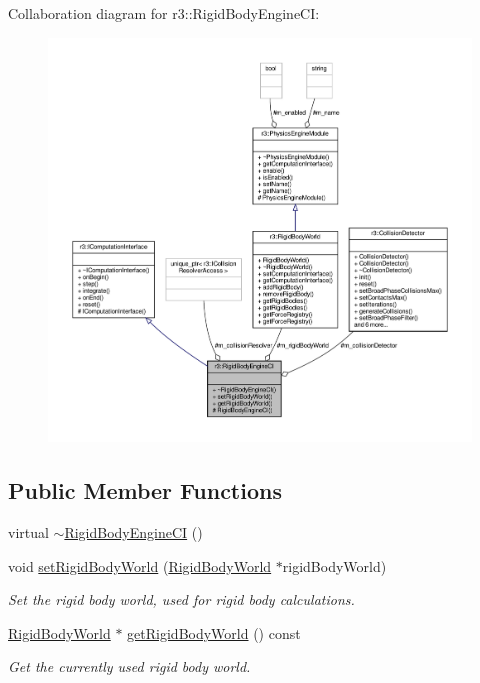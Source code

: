 Collaboration diagram for r3\+:\+:Rigid\+Body\+Engine\+CI\+:\nopagebreak
\begin{figure}[H]
\begin{center}
\leavevmode
\includegraphics[width=350pt]{classr3_1_1_rigid_body_engine_c_i__coll__graph}
\end{center}
\end{figure}
\subsection*{Public Member Functions}
\begin{DoxyCompactItemize}
\item 
virtual \mbox{\hyperlink{classr3_1_1_rigid_body_engine_c_i_a9f75c8c49e987206554b09550d93b341}{$\sim$\+Rigid\+Body\+Engine\+CI}} ()
\item 
void \mbox{\hyperlink{classr3_1_1_rigid_body_engine_c_i_a6787623e1862550ce04f1d970375b0ce}{set\+Rigid\+Body\+World}} (\mbox{\hyperlink{classr3_1_1_rigid_body_world}{Rigid\+Body\+World}} $\ast$rigid\+Body\+World)
\begin{DoxyCompactList}\small\item\em Set the rigid body world, used for rigid body calculations. \end{DoxyCompactList}\item 
\mbox{\hyperlink{classr3_1_1_rigid_body_world}{Rigid\+Body\+World}} $\ast$ \mbox{\hyperlink{classr3_1_1_rigid_body_engine_c_i_affb7b66f769300619e0c61f7d3ab13ee}{get\+Rigid\+Body\+World}} () const
\begin{DoxyCompactList}\small\item\em Get the currently used rigid body world. \end{DoxyCompactList}\end{DoxyCompactItemize}
